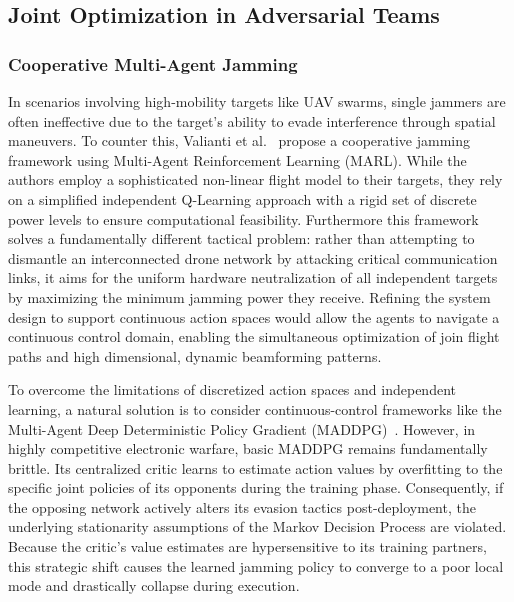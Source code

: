 \documentclass[journal]{IEEEtran}
\newcommand{\adm}[1]{{\color{orange}{[#1]}}}
\begin{document}
\subsection{Joint Optimization in Adversarial Teams}

\subsubsection{Cooperative Multi-Agent Jamming}
In scenarios involving high-mobility targets like UAV swarms, single jammers are often ineffective due to the target's ability to evade interference through spatial maneuvers. 
To counter this, Valianti et al.~\cite{valianti2024cooperative} propose a cooperative jamming framework using Multi-Agent Reinforcement Learning (MARL). 
While the authors employ a sophisticated non-linear flight model to their targets, they rely on a simplified independent Q-Learning approach with a rigid set of discrete power levels to ensure computational feasibility.
Furthermore this framework solves a fundamentally different tactical problem: rather than attempting to dismantle an interconnected drone network by attacking critical communication links, it aims for the uniform hardware neutralization of all independent targets by maximizing the minimum jamming power they receive.
Refining the system design to support continuous action spaces would allow the agents to navigate a continuous control domain, enabling the simultaneous optimization of join flight paths and high dimensional, dynamic beamforming patterns.

To overcome the limitations of discretized action spaces and independent learning, a natural solution is to consider continuous-control frameworks like the Multi-Agent Deep Deterministic Policy Gradient (MADDPG)~\cite{NIPS2017_68a97503}.
However, in highly competitive electronic warfare, basic MADDPG remains fundamentally brittle.
Its centralized critic learns to estimate action values by overfitting to the specific joint policies of its opponents during the training phase. 
Consequently, if the opposing network actively alters its evasion tactics post-deployment, the underlying stationarity assumptions of the Markov Decision Process are violated. 
Because the critic's value estimates are hypersensitive to its training partners, this strategic shift causes the learned jamming policy to converge to a poor local mode and drastically collapse during execution.
\end{document}
